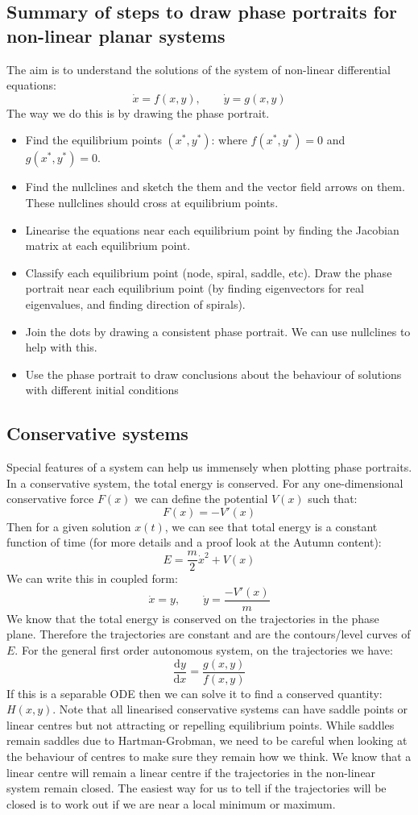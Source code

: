 \documentclass[12pt]{article}
\newcommand{\df}[2]{\frac{\text{d}#1}{\text{d}#2}}
\begin{document}
\subsection*{Summary of steps to draw phase portraits for non-linear planar systems}
The aim is to understand the solutions of the system of non-linear differential equations:
\[\dot{x} = f(x, y),\qquad \dot{y} = g(x, y)\]
The way we do this is by drawing the phase portrait.
\begin{itemize}
    \item Find the equilibrium points \((x^*, y^*)\): where \(f(x^*, y^*) = 0\) and \(g(x^*, y^*) = 0\).
    \item Find the nullclines and sketch the them and the vector field arrows on them. These nullclines should cross at equilibrium points.
    \item Linearise the equations near each equilibrium point by finding the Jacobian matrix at each equilibrium point.
    \item Classify each equilibrium point (node, spiral, saddle, etc). Draw the phase portrait near each equilibrium point (by finding eigenvectors for real eigenvalues, and finding direction of spirals).
    \item Join the dots by drawing a consistent phase portrait. We can use nullclines to help with this.
    \item Use the phase portrait to draw conclusions about the behaviour of solutions with different initial conditions
\end{itemize}
\subsection*{Conservative systems}
Special features of a system can help us immensely when plotting phase portraits. In a conservative system, the total energy is conserved. For any one-dimensional conservative force \(F(x)\) we can define the potential \(V(x)\) such that:
\[F(x)=-V'(x)\]
Then for a given solution \(x(t)\), we can see that total energy is a constant function of time (for more details and a proof look at the Autumn content):
\[E=\frac{m}{2}\dot{x}^2+V(x)\]
We can write this in coupled form:
\[\dot{x}=y,\qquad \dot{y}=\frac{-V'(x)}{m}\]
We know that the total energy is conserved on the trajectories in the phase plane. Therefore the trajectories are constant and are the contours/level curves of \(E\). For the general first order autonomous system, on the trajectories we have:
\[\df{y}{x}=\frac{g(x,y)}{f(x,y)}\]
If this is a separable ODE then we can solve it to find a conserved quantity: \(H(x,y)\). Note that all linearised conservative systems can have saddle points or linear centres but not attracting or repelling equilibrium points. While saddles remain saddles due to Hartman-Grobman, we need to be careful when looking at the behaviour of centres to make sure they remain how we think. We know that a linear centre will remain a linear centre if the trajectories in the non-linear system remain closed. The easiest way for us to tell if the trajectories will be closed is to work out if we are near a local minimum or maximum.
\end{document}
